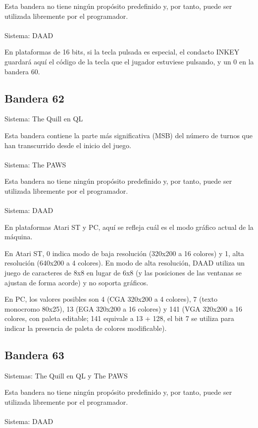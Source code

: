 \documentclass[11pt, a5paper]{article}
\newcommand{\quill}{\textsf{The Quill}\xspace}
\newcommand{\paw}{\textsf{The PAWS}\xspace}
\newcommand{\daad}{\textsf{DAAD}\xspace}
\newcommand{\sistema}[1]{\noindent Sistema: #1 \nopagebreak}
\newcommand{\sistemas}[1]{\noindent Sistemas: #1 \nopagebreak}
\begin{document}
Esta bandera no tiene ningún propósito predefinido y, por tanto, puede ser utilizada libremente por el programador.
\\\ \\
\sistema{\daad}

En plataformas de 16 bits, si la tecla pulsada es especial, el condacto INKEY guardará aquí el código de la tecla que el jugador estuviese pulsando, y un 0 en la bandera 60. \cite[págs. 25, 61 y 62]{DAAD}

\subsection{Bandera 62}

\sistema{\quill en QL}

Esta bandera contiene la parte más significativa (MSB) del número de turnos que han transcurrido desde el inicio del juego.
\\\ \\
\sistema{\paw}

Esta bandera no tiene ningún propósito predefinido y, por tanto, puede ser utilizada libremente por el programador.
\\\ \\
\sistema{\daad}

En plataformas Atari ST y PC, aquí se refleja cuál es el modo gráfico actual de la máquina. \cite[pág. 62]{DAAD}

En Atari ST, 0 indica modo de baja resolución (320x200 a 16 colores) y 1, alta resolución (640x200 a 4 colores). En modo de alta resolución, \daad utiliza un juego de caracteres de 8x8 en lugar de 6x8 (y las posiciones de las ventanas se ajustan de forma acorde) y no soporta gráficos.

En PC, los valores posibles son 4 (CGA 320x200 a 4 colores), 7 (texto monocromo 80x25), 13 (EGA 320x200 a 16 colores) y 141 (VGA 320x200 a 16 colores, con paleta editable; 141 equivale a 13 + 128, el bit 7 se utiliza para indicar la presencia de paleta de colores modificable).

\subsection{Bandera 63}

\sistemas{\quill en QL y \paw}

Esta bandera no tiene ningún propósito predefinido y, por tanto, puede ser utilizada libremente por el programador.
\\\ \\
\sistema{\daad}
\end{document}
